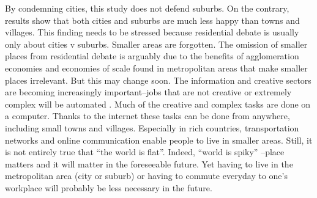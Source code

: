 \documentclass[12pt, letterpaper]{article}
\begin{document}
\begin{spacing}{1.9}
By condemning cities, this study does not
defend suburbs. On the contrary, results show that both cities and suburbs are much
 less happy than  towns and villages.  This finding needs to be stressed because
 residential debate is usually only about
 cities v suburbs. Smaller areas are forgotten. The omission of
 smaller places from residential debate is arguably due to the
 benefits of
 agglomeration economies and economies of scale found in metropolitan
 areas that make smaller places irrelevant. But this may change
 soon. The information and creative sectors are becoming increasingly
 important--jobs that are not creative or extremely complex will be
 automated \citep{brynjolfsson14}. Much of the creative and complex tasks are done on a
 computer. Thanks to the  internet these tasks can be done from anywhere,
 including small towns and villages. Especially in rich countries,
 transportation networks and online communication enable people to live in
 smaller areas.   Still, it
   is not entirely true that ``the world is
   flat''\citep{freidman05}. Indeed, ``world is spiky''
   \citep{florida08}--place matters and it will matter in the
   foreseeable future. Yet having to live in the
   metropolitan area (city or suburb) or having to commute
   everyday to one's workplace will probably be less necessary in the
   future. 


\end{spacing}
\end{document}
